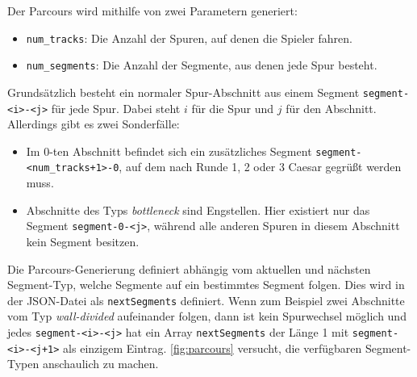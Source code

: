 \documentclass[]{article}
\begin{document}
Der Parcours wird mithilfe von zwei Parametern generiert:
\begin{itemize}
    \item \texttt{num\_tracks}: Die Anzahl der Spuren, auf denen die Spieler fahren.
    \item \texttt{num\_segments}: Die Anzahl der Segmente, aus denen jede Spur besteht.
\end{itemize}
Grundsätzlich besteht ein normaler Spur-Abschnitt aus einem Segment \texttt{segment-<i>-<j>} für jede Spur. Dabei steht $i$ für die Spur und $j$ für den Abschnitt. Allerdings gibt es zwei Sonderfälle:
\begin{itemize}
    \item Im $0$-ten Abschnitt befindet sich ein zusätzliches Segment \texttt{segment-<num\_tracks+1>-0}, auf dem nach Runde 1, 2 oder 3 Caesar gegrüßt werden muss.
    \item Abschnitte des Typs \emph{bottleneck} sind Engstellen. Hier existiert nur das Segment \texttt{segment-0-<j>}, während alle anderen Spuren in diesem Abschnitt kein Segment besitzen.
\end{itemize}
Die Parcours-Generierung definiert abhängig vom aktuellen und nächsten Segment-Typ, welche Segmente auf ein bestimmtes Segment folgen. Dies wird in der JSON-Datei als \texttt{nextSegments} definiert. Wenn zum Beispiel zwei Abschnitte vom Typ \emph{wall-divided} aufeinander folgen, dann ist kein Spurwechsel möglich und jedes \texttt{segment-<i>-<j>} hat ein Array \texttt{nextSegments} der Länge 1 mit \texttt{segment-<i>-<j+1>} als einzigem Eintrag. \autoref{fig:parcours} versucht, die verfügbaren Segment-Typen anschaulich zu machen.
\end{document}
